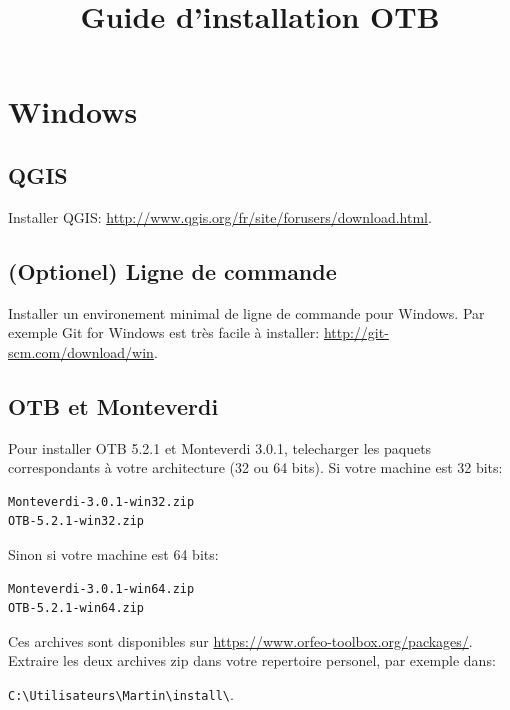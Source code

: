 \documentclass[10pt,a4paper]{article}
\title{Guide d'installation OTB}
\begin{document}
\maketitle

\section{Windows}

\subsection{QGIS}
Installer QGIS: \url{http://www.qgis.org/fr/site/forusers/download.html}.

\subsection{(Optionel) Ligne de commande}
Installer un environement minimal de ligne de commande pour Windows. Par exemple
Git for Windows est très facile à installer:
\url{http://git-scm.com/download/win}.

\subsection{OTB et Monteverdi}
Pour installer OTB 5.2.1 et Monteverdi 3.0.1, telecharger les paquets
correspondants à votre architecture (32 ou 64 bits). Si votre machine est 32
bits:

\begin{verbatim}
Monteverdi-3.0.1-win32.zip
OTB-5.2.1-win32.zip
\end{verbatim}

Sinon si votre machine est 64 bits:

\begin{verbatim}
Monteverdi-3.0.1-win64.zip
OTB-5.2.1-win64.zip
\end{verbatim}

Ces archives sont disponibles sur \url{https://www.orfeo-toolbox.org/packages/}.
Extraire les deux archives zip dans votre repertoire personel, par exemple dans:\\
\begin{centering}
\texttt{C:{\textbackslash}Utilisateurs{\textbackslash}Martin{\textbackslash}install{\textbackslash}}.
\end{centering}
\end{document}

